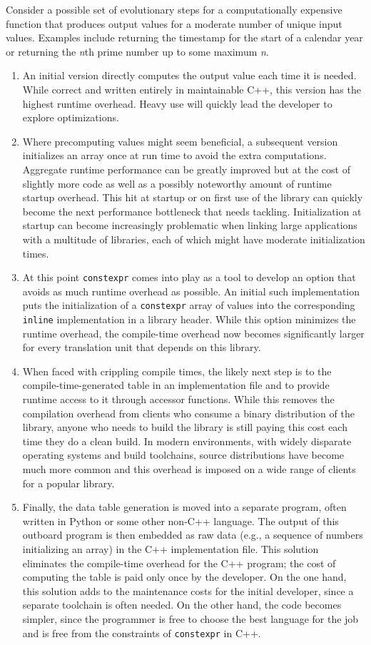 Consider a possible set of evolutionary steps for a computationally
expensive function that produces output values for a moderate number of
unique input values. Examples include returning the timestamp for the
start of a calendar year or returning the \emph{n}th prime number up to
some maximum \emph{n}.

\begin{enumerate}
\item{An initial version directly computes the output value each time it is needed. While correct and written entirely in maintainable C++, this version has the highest runtime overhead. Heavy use will quickly lead the developer to explore optimizations.}
\item{Where precomputing values might seem beneficial, a subsequent version initializes an array once at run time to avoid the extra computations. Aggregate runtime performance can be greatly improved but at the cost of slightly more code as well as a possibly noteworthy amount of runtime startup overhead. This hit at startup or on first use of the library can quickly become the next performance bottleneck that needs tackling. Initialization at startup can become increasingly problematic when linking large applications with a multitude of libraries, each of which might have moderate initialization times.}
\item{At this point \lstinline!constexpr! comes into play as a tool to develop an option that avoids as much runtime overhead as possible. An initial such implementation puts the initialization of a \lstinline!constexpr! array of values into the corresponding \lstinline!inline! implementation in a library header. While this option minimizes the runtime overhead, the compile-time overhead now becomes significantly larger for every translation unit that depends on this library.}
\item{When faced with crippling compile times, the likely next step is to  the compile-time-generated table in an implementation file and to provide runtime access to it through accessor functions. While this removes the compilation overhead from clients who consume a binary distribution of the library, anyone who needs to build the library is still paying this cost each time they do a clean build. In modern environments, with widely disparate operating systems and build toolchains, source distributions have become much more common and this overhead is imposed on a wide range of clients for a popular library.}
\item{Finally, the data table generation is moved into a separate program, often written in Python or some other non-C++ language. The output of this outboard program is then embedded as raw data (e.g., a sequence of numbers initializing an array) in the C++ implementation file. This solution eliminates the compile-time overhead for the C++ program; the cost of computing the table is paid only once by the developer. On the one hand, this solution adds to the maintenance costs for the initial developer, since a separate toolchain is often needed. On the other hand, the code becomes simpler, since the programmer is free to choose the best language for the job and is free from the constraints of \lstinline!constexpr! in C++.}

\end{enumerate}
